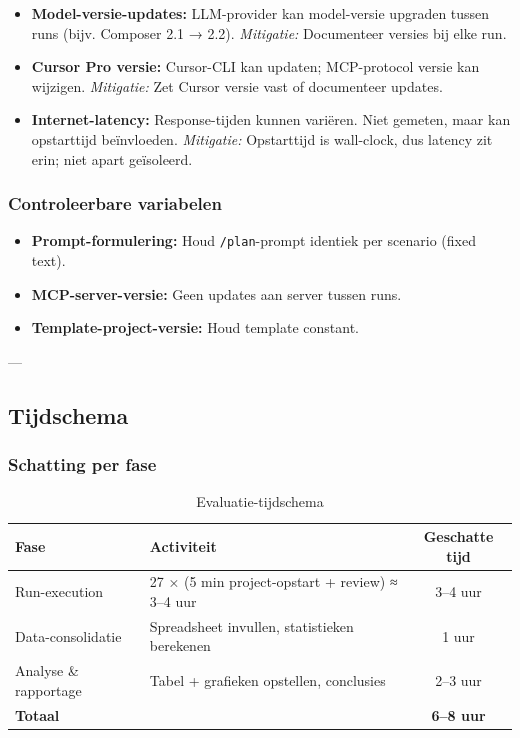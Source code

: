 \begin{itemize}
  \item \textbf{Model-versie-updates:} LLM-provider kan model-versie upgraden tussen runs (bijv. Composer 2.1 → 2.2). \newline
    \textit{Mitigatie:} Documenteer versies bij elke run.
  
  \item \textbf{Cursor Pro versie:} Cursor-CLI kan updaten; MCP-protocol versie kan wijzigen. \newline
    \textit{Mitigatie:} Zet Cursor versie vast of documenteer updates.
  
  \item \textbf{Internet-latency:} Response-tijden kunnen variëren. Niet gemeten, maar kan opstarttijd beïnvloeden. \newline
    \textit{Mitigatie:} Opstarttijd is wall-clock, dus latency zit erin; niet apart geïsoleerd.
\end{itemize}

\subsubsection{Controleerbare variabelen}

\begin{itemize}
  \item \textbf{Prompt-formulering:} Houd \texttt{/plan}-prompt identiek per scenario (fixed text).
  \item \textbf{MCP-server-versie:} Geen updates aan server tussen runs.
  \item \textbf{Template-project-versie:} Houd template constant.
\end{itemize}

---

\subsection{Tijdschema}

\subsubsection{Schatting per fase}

\begin{table}[htbp]
  \centering
  \caption{Evaluatie-tijdschema}
  \label{tab:eval-timeline}
  \small
  \begin{tabularx}{\textwidth}{|l|X|c|}
    \hline
    \textbf{Fase} & \textbf{Activiteit} & \textbf{Geschatte tijd} \\
    \hline
    Run-execution & 27 × (5 min project-opstart + review) ≈ 3--4 uur & 3--4 uur \\
    \hline
    Data-consolidatie & Spreadsheet invullen, statistieken berekenen & 1 uur \\
    \hline
    Analyse \& rapportage & Tabel + grafieken opstellen, conclusies & 2--3 uur \\
    \hline
    \textbf{Totaal} & & \textbf{6--8 uur} \\
    \hline
  \end{tabularx}
\end{table}

